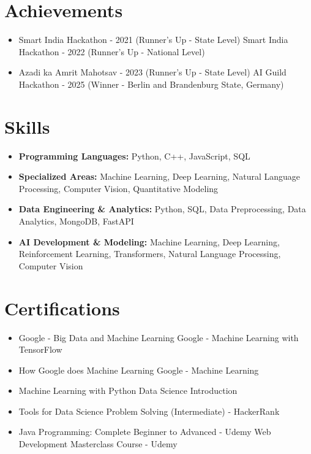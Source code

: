 \documentclass[a4paper,10pt]{article}
\begin{document}
\section*{Achievements}
\begin{itemize}
\item Smart India Hackathon - 2021 (Runner's Up - State Level) \hfill Smart India Hackathon - 2022 (Runner's Up - National Level)
\item Azadi ka Amrit Mahotsav - 2023 (Runner's Up - State Level) \hfill AI Guild Hackathon - 2025 (Winner - Berlin and Brandenburg State, Germany)
\end{itemize}

\section*{Skills}
\begin{itemize}
  \item \textbf{Programming Languages:} Python, C++, JavaScript, SQL
  \item \textbf{Specialized Areas:} Machine Learning, Deep Learning, Natural Language Processing, Computer Vision, Quantitative Modeling
  \item \textbf{Data Engineering \& Analytics:} Python, SQL, Data Preprocessing, Data Analytics, MongoDB, FastAPI
  \item \textbf{AI Development \& Modeling:} Machine Learning, Deep Learning, Reinforcement Learning, Transformers, Natural Language Processing, Computer Vision
\end{itemize}

\section*{Certifications}
\begin{itemize}
\item Google - Big Data and Machine Learning \hfill Google - Machine Learning with TensorFlow
\item How Google does Machine Learning \hfill Google - Machine Learning
\item Machine Learning with Python \hfill Data Science Introduction
\item Tools for Data Science \hfill Problem Solving (Intermediate) - HackerRank
\item Java Programming: Complete Beginner to Advanced - Udemy \hfill Web Development Masterclass Course - Udemy
\end{itemize}
\end{document}
